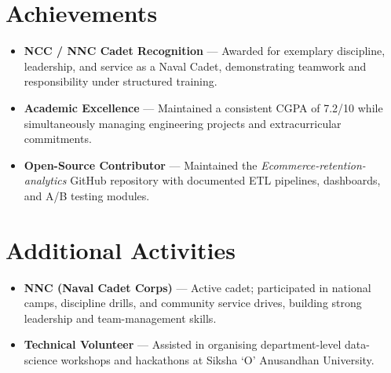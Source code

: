 \documentclass[10pt,a4paper]{article}
\begin{document}
\section{Achievements}
\begin{itemize}
  \item \textbf{NCC / NNC Cadet Recognition} — Awarded for exemplary discipline, leadership, and
        service as a Naval Cadet, demonstrating teamwork and responsibility under structured training.
  \item \textbf{Academic Excellence} — Maintained a consistent CGPA of 7.2/10 while simultaneously
        managing engineering projects and extracurricular commitments.
  \item \textbf{Open-Source Contributor} — Maintained the \textit{Ecommerce-retention-analytics}
        GitHub repository with documented ETL pipelines, dashboards, and A/B testing modules.
\end{itemize}

\section{Additional Activities}
\begin{itemize}
  \item \textbf{NNC (Naval Cadet Corps)} — Active cadet; participated in national camps,
        discipline drills, and community service drives, building strong leadership and
        team-management skills.
  \item \textbf{Technical Volunteer} — Assisted in organising department-level data-science
        workshops and hackathons at Siksha `O' Anusandhan University.
\end{itemize}
\end{document}

